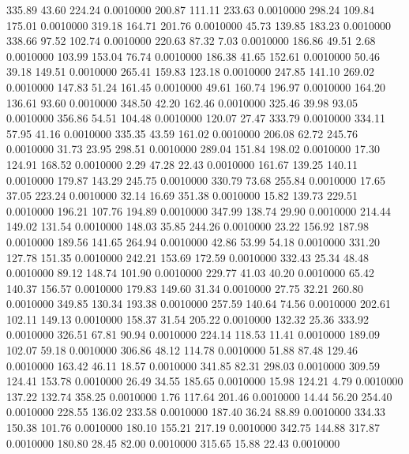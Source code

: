  335.89   43.60  224.24   0.0010000
 200.87  111.11  233.63   0.0010000
 298.24  109.84  175.01   0.0010000
 319.18  164.71  201.76   0.0010000
  45.73  139.85  183.23   0.0010000
 338.66   97.52  102.74   0.0010000
 220.63   87.32    7.03   0.0010000
 186.86   49.51    2.68   0.0010000
 103.99  153.04   76.74   0.0010000
 186.38   41.65  152.61   0.0010000
  50.46   39.18  149.51   0.0010000
 265.41  159.83  123.18   0.0010000
 247.85  141.10  269.02   0.0010000
 147.83   51.24  161.45   0.0010000
  49.61  160.74  196.97   0.0010000
 164.20  136.61   93.60   0.0010000
 348.50   42.20  162.46   0.0010000
 325.46   39.98   93.05   0.0010000
 356.86   54.51  104.48   0.0010000
 120.07   27.47  333.79   0.0010000
 334.11   57.95   41.16   0.0010000
 335.35   43.59  161.02   0.0010000
 206.08   62.72  245.76   0.0010000
  31.73   23.95  298.51   0.0010000
 289.04  151.84  198.02   0.0010000
  17.30  124.91  168.52   0.0010000
   2.29   47.28   22.43   0.0010000
 161.67  139.25  140.11   0.0010000
 179.87  143.29  245.75   0.0010000
 330.79   73.68  255.84   0.0010000
  17.65   37.05  223.24   0.0010000
  32.14   16.69  351.38   0.0010000
  15.82  139.73  229.51   0.0010000
 196.21  107.76  194.89   0.0010000
 347.99  138.74   29.90   0.0010000
 214.44  149.02  131.54   0.0010000
 148.03   35.85  244.26   0.0010000
  23.22  156.92  187.98   0.0010000
 189.56  141.65  264.94   0.0010000
  42.86   53.99   54.18   0.0010000
 331.20  127.78  151.35   0.0010000
 242.21  153.69  172.59   0.0010000
 332.43   25.34   48.48   0.0010000
  89.12  148.74  101.90   0.0010000
 229.77   41.03   40.20   0.0010000
  65.42  140.37  156.57   0.0010000
 179.83  149.60   31.34   0.0010000
  27.75   32.21  260.80   0.0010000
 349.85  130.34  193.38   0.0010000
 257.59  140.64   74.56   0.0010000
 202.61  102.11  149.13   0.0010000
 158.37   31.54  205.22   0.0010000
 132.32   25.36  333.92   0.0010000
 326.51   67.81   90.94   0.0010000
 224.14  118.53   11.41   0.0010000
 189.09  102.07   59.18   0.0010000
 306.86   48.12  114.78   0.0010000
  51.88   87.48  129.46   0.0010000
 163.42   46.11   18.57   0.0010000
 341.85   82.31  298.03   0.0010000
 309.59  124.41  153.78   0.0010000
  26.49   34.55  185.65   0.0010000
  15.98  124.21    4.79   0.0010000
 137.22  132.74  358.25   0.0010000
   1.76  117.64  201.46   0.0010000
  14.44   56.20  254.40   0.0010000
 228.55  136.02  233.58   0.0010000
 187.40   36.24   88.89   0.0010000
 334.33  150.38  101.76   0.0010000
 180.10  155.21  217.19   0.0010000
 342.75  144.88  317.87   0.0010000
 180.80   28.45   82.00   0.0010000
 315.65   15.88   22.43   0.0010000

